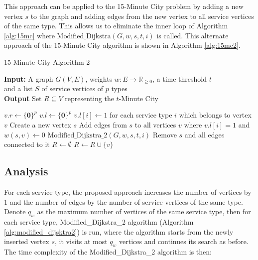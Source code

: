 This approach can be applied to the 15-Minute City problem by adding a new vertex $s$ to the graph and adding edges from the new vertex to all service vertices of the same type. This allows us to eliminate the inner loop of Algorithm \ref{alg:15mc} where $\text{Modified\_Dijkstra}(G, w, s, t, i)$ is called. This alternate approach of the 15-Minute City algorithm is shown in Algorithm \ref{alg:15mc2}.

\begin{algorithm}[H]
    \caption{15-Minute City Algorithm 2} \label{alg:15mc2}
    \textbf{Input:} A graph $G(V,E)$, weights $w:E\rightarrow\mathbb{R}_{\geq 0}$, a time threshold $t$ \\  and a list $S$ of service vertices of $p$ types\\
    \textbf{Output} Set $R\subseteq V$ representing the $t$-Minute City
    \begin{algorithmic}
            \State $v.r \gets \{\mathbf{0}\}^{p}$
            \State $v.l \gets \{\mathbf{0}\}^{p}$
        \EndFor
            \State $v.l[i] \gets 1$ for each service type $i$ which belongs to vertex $v$
        \EndFor
            \State Create a new vertex $s$
            \State Add edges from $s$ to all vertices $v$ where $v.l[i]=1$ and $w(s,v) \gets 0$
            \State $\text{Modified\_Dijkstra\_2}(G,w,s,t,i)$
            \State Remove $s$ and all edges connected to it
        \EndFor
        \State $R\gets\emptyset$
                \State $R \gets R\cup \{v\}$
            \EndIf
        \EndFor
    \end{algorithmic}
\end{algorithm}

\subsection{Analysis}

For each service type, the proposed approach increases the number of vertices by 1 and the number of edges by the number of service vertices of the same type. Denote $q_w$ as the maximum number of vertices of the same service type, then for each service type, Modified\_Dijkstra\_2 algorithm (Algorithm \ref{alg:modified_dijsktra2}) is run, where the algorithm starts from the newly inserted vertex $s$, it visits at most $q_w$ vertices and continues its search as before. The time complexity of the Modified\_Dijkstra\_2 algorithm is then:

